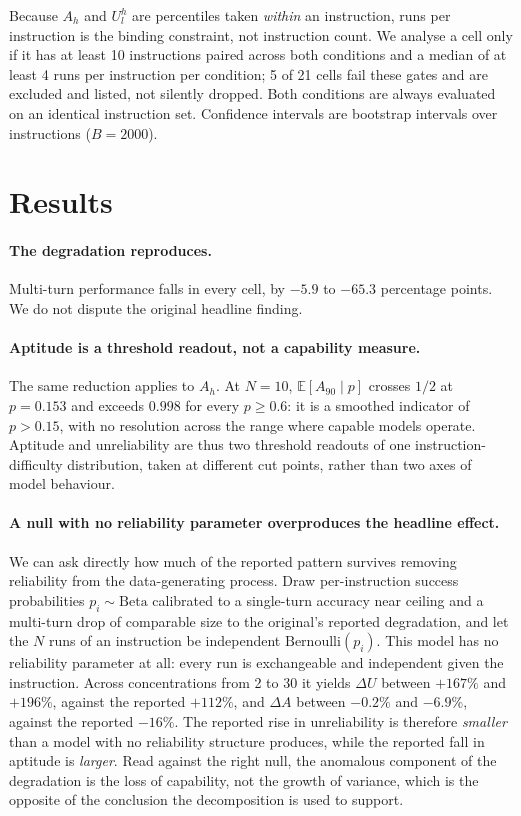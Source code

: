 \documentclass{article}
\begin{document}
Because $A_h$ and $U^h_l$ are percentiles taken \emph{within} an instruction, runs per instruction
is the binding constraint, not instruction count. We analyse a cell only if it has at least 10
instructions paired across both conditions and a median of at least 4 runs per instruction per
condition; 5 of 21 cells fail these gates and are excluded and listed, not silently dropped. Both
conditions are always evaluated on an identical instruction set. Confidence intervals are bootstrap
intervals over instructions ($B = 2000$).

\section{Results}

\paragraph{The degradation reproduces.} Multi-turn performance falls in every cell, by $-5.9$ to
$-65.3$ percentage points. We do not dispute the original headline finding.

\paragraph{Aptitude is a threshold readout, not a capability measure.} The same reduction applies to $A_h$. At $N = 10$, $\mathbb{E}[A_{90} \mid p]$ crosses $1/2$ at $p = 0.153$ and exceeds $0.998$ for every $p \ge 0.6$: it is a smoothed indicator of $p > 0.15$, with no resolution across the range where capable models operate. Aptitude and unreliability are thus two threshold readouts of one instruction-difficulty distribution, taken at different cut points, rather than two axes of model behaviour.

\paragraph{A null with no reliability parameter overproduces the headline effect.} We can ask
directly how much of the reported pattern survives removing reliability from the data-generating
process. Draw per-instruction success probabilities $p_i \sim \mathrm{Beta}$ calibrated to a single-turn accuracy near ceiling and a multi-turn drop of comparable size to the original's reported degradation, and let the $N$ runs of an
instruction be independent $\mathrm{Bernoulli}(p_i)$. This model has no reliability parameter at
all: every run is exchangeable and independent given the instruction. Across concentrations from 2
to 30 it yields $\Delta U$ between $+167\%$ and $+196\%$, against the reported $+112\%$, and $\Delta A$ between $-0.2\%$ and $-6.9\%$, against the reported $-16\%$. The reported rise in
unreliability is therefore \emph{smaller} than a model with no reliability structure produces, while
the reported fall in aptitude is \emph{larger}. Read against the right null, the anomalous component
of the degradation is the loss of capability, not the growth of variance, which is the opposite of the
conclusion the decomposition is used to support.
\end{document}
